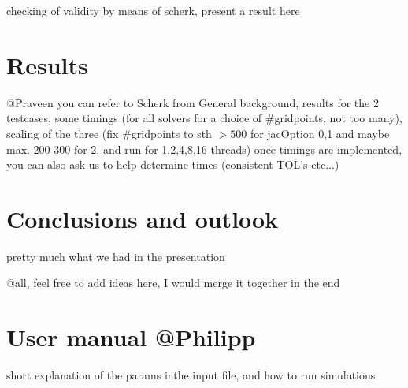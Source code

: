 \documentclass[11pt]{scrartcl}
\begin{document}
checking of validity by means of scherk, present a result here

\section{Results}
@Praveen you can refer to Scherk from General background, 
results for the 2 testcases, some timings (for all solvers for a choice of $\#$gridpoints, not too many), scaling of the three (fix $\#$gridpoints to sth $>500$ for jacOption 0,1 and maybe max. 200-300 for 2, and run for 1,2,4,8,16 threads)
once timings are implemented, you can also ask us to help determine times (consistent TOL's etc...)


\section{Conclusions and outlook}
pretty much what we had in the presentation

@all, feel free to add ideas here, I would merge it together in the end


%


\appendix
\section{User manual @Philipp}
short explanation of the params inthe input file, and how to run simulations
\end{document}
